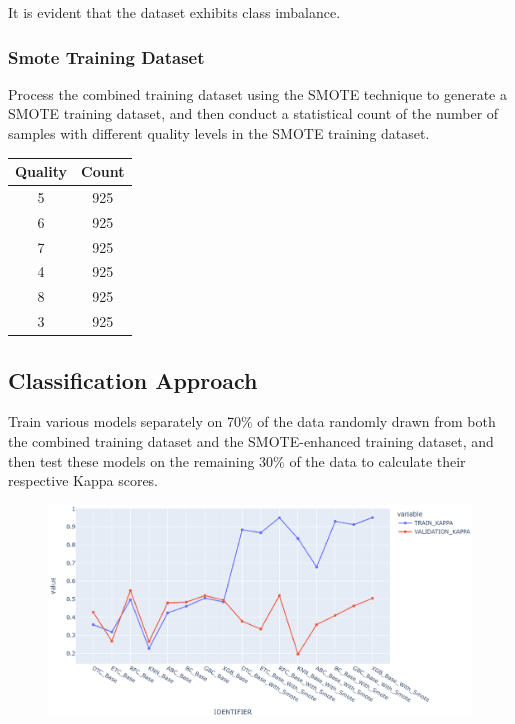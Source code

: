 It is evident that the dataset exhibits class imbalance.

\subsubsection{Smote Training Dataset}\phantom{...}

Process the combined training dataset using the SMOTE technique to generate a SMOTE training dataset, and then conduct a statistical count of the number of samples with different quality levels in the SMOTE training dataset.

\begin{center}
	\begin{tabular}{|c|c|}
		\hline
		Quality & Count \\
		\hline
		5 & 925 \\
		6 & 925 \\
		7 & 925 \\
		4 & 925 \\
		8 & 925 \\
		3 & 925 \\
		\hline
	\end{tabular}
\end{center}

\subsection{Classification Approach}\phantom{...}

Train various models separately on 70\% of the data randomly drawn from both the combined training dataset and the SMOTE-enhanced training dataset, and then test these models on the remaining 30\% of the data to calculate their respective Kappa scores.

\begin{figure}[H]
	\centering
	\includegraphics[width=1\linewidth]{tex/kappa}
	\caption{}
	\label{fig:kappa}
\end{figure}


